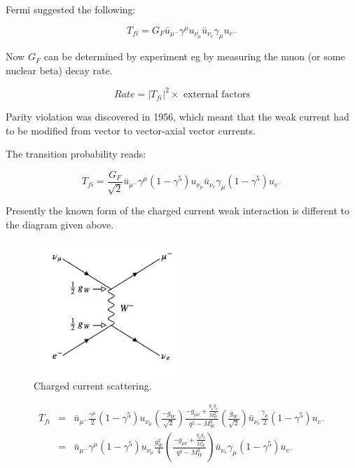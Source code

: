 Fermi suggested the following:

\[
  T_{fi} = G_F\bar{u}_{\mu^-}\gamma^{\mu}u_{\nu_{\mu}}\bar{u}_{\nu_{e}}\gamma_{\mu}u_{e^-}
\]

Now $G_F$ can be determined by experiment eg by measuring the muon (or some nuclear beta) decay rate.

\[
  Rate = |T_{fi}|^2 \times \textrm{ external factors}
\]

Parity violation was discovered in 1956, which meant that the weak current had to be modified from vector to vector-axial vector currents.

The transition probability reads:

\[
  T_{fi} = \frac{G_F}{\sqrt{2}}\bar{u}_{\mu^-}\gamma^{\mu}(1 - \gamma^5)u_{\nu_{\mu}}\bar{u}_{\nu_e}\gamma_{\mu}(1 - \gamma^5)u_{e^-}
\]

Presently the known form of the charged current weak interaction is different to the diagram given above.

\begin{figure}[!htb]
  \begin{center}
    \includegraphics[width=0.5\textwidth]{images/web_feynman/image_43.png}
    \caption[Charged current scattering]{Charged current scattering.}
    \label{fig:ch12_chargedCurrentScattering}
  \end{center}
\end{figure}

\begin{eqnarray*}
  T_{fi} & = & \bar{u}_{\mu^-}\frac{\gamma^{\mu}}{2}(1 - \gamma^5)u_{\nu_{\mu}}\left(\frac{-g_W}{\sqrt{2}}\right)\frac{-g_{\mu\nu} + \frac{q_{\mu}q_{\nu}}{M_W^2}}{q^2 - M_W^2}\left(\frac{g_W}{\sqrt{2}}\right)\bar{u}_{\nu_e}\frac{\gamma_{\mu}}{2}(1 - \gamma^5)u_{e^-} \\
  & = & \bar{u}_{\mu^-}\gamma^{\mu}(1 - \gamma^5)u_{\nu_{\mu}}\frac{g_W^2}{4}\left(\frac{-g_{\mu\nu} + \frac{q_{\mu}q_{\nu}}{M_W^2}}{q^2 - M_W^2}\right)\bar{u}_{\nu_e}\gamma_{\mu}(1 - \gamma^5)u_{e^-}
\end{eqnarray*}

